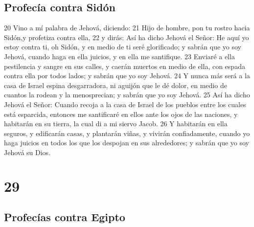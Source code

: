 \section*{Profecía contra Sidón}

20 Vino a mí palabra de Jehová, diciendo:
21 Hijo de hombre, pon tu rostro hacia Sidón,y profetiza contra ella,
22 y dirás: Así ha dicho Jehová el Señor: He aquí yo estoy contra ti, oh Sidón, y en medio de ti seré glorificado; y sabrán que yo soy Jehová, cuando haga en ella juicios, y en ella me santifique.
23 Enviaré a ella pestilencia y sangre en sus calles, y caerán muertos en medio de ella, con espada contra ella por todos lados; y sabrán que yo soy Jehová.
24 Y nunca más será a la casa de Israel espina desgarradora, ni aguijón que le dé dolor, en medio de cuantos la rodean y la menosprecian; y sabrán que yo soy Jehová.
25 Así ha dicho Jehová el Señor: Cuando recoja a la casa de Israel de los pueblos entre los cuales está esparcida, entonces me santificaré en ellos ante los ojos de las naciones, y habitarán en su tierra, la cual di a mi siervo Jacob.
26 Y habitarán en ella seguros, y edificarán casas, y plantarán viñas, y vivirán confiadamente, cuando yo haga juicios en todos los que los despojan en sus alrededores; y sabrán que yo soy Jehová su Dios.

\chapter{29}

\section*{Profecías contra Egipto}


